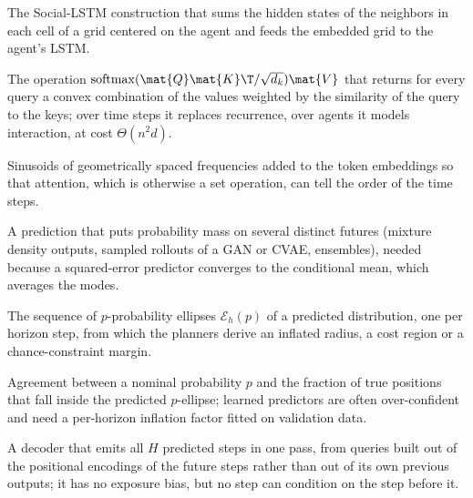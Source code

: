 \item[Social pooling] The Social-LSTM construction that sums the hidden states of the neighbors in each cell of a grid centered on the agent and feeds the embedded grid to the agent's LSTM.
\item[Attention] The operation $\operatorname{softmax}(\mat{Q}\mat{K}\T/\sqrt{d_k})\mat{V}$ that returns for every query a convex combination of the values weighted by the similarity of the query to the keys; over time steps it replaces recurrence, over agents it models interaction, at cost $\Theta(n^2 d)$.
\item[Positional encoding] Sinusoids of geometrically spaced frequencies added to the token embeddings so that attention, which is otherwise a set operation, can tell the order of the time steps.
\item[Multimodal prediction] A prediction that puts probability mass on several distinct futures (mixture density outputs, sampled rollouts of a GAN or CVAE, ensembles), needed because a squared-error predictor converges to the conditional mean, which averages the modes.
\item[Time-indexed occupancy region] The sequence of $p$-probability ellipses $\mathcal{E}_h(p)$ of a predicted distribution, one per horizon step, from which the planners derive an inflated radius, a cost region or a chance-constraint margin.
\item[Calibration] Agreement between a nominal probability $p$ and the fraction of true positions that fall inside the predicted $p$-ellipse; learned predictors are often over-confident and need a per-horizon inflation factor fitted on validation data.
\item[Non-autoregressive decoder] A decoder that emits all $H$ predicted steps in one pass, from queries built out of the positional encodings of the future steps rather than out of its own previous outputs; it has no exposure bias, but no step can condition on the step before it.
